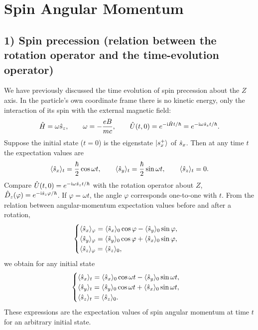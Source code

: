 \section{Spin Angular Momentum}
\subsection*{1) Spin precession (relation between the rotation operator and the time-evolution operator)}
We have previously discussed the time evolution of spin precession about the $Z$ axis. In the particle's own coordinate frame there is no kinetic energy, only the interaction of its spin with the external magnetic field:
\begin{equation}
\hat{H}=\omega\hat{s}_z,\qquad \omega=-\frac{eB}{mc},\qquad
\hat{U}(t,0)=e^{-\mathrm{i}\hat{H}t/\hbar}=e^{-\mathrm{i}\omega\hat{s}_zt/\hbar}.
\end{equation}
Suppose the initial state ($t=0$) is the eigenstate $\left|s_x^+\right\rangle$ of $\hat{s}_x$. Then at any time $t$ the expectation values are
\begin{equation}
\langle\hat{s}_x\rangle_t=\frac\hbar2\cos\omega t,\qquad
\langle\hat{s}_y\rangle_t=\frac\hbar2\sin\omega t,\qquad
\langle\hat{s}_z\rangle_t=0.
\end{equation}
Compare $\hat{U}(t,0)=e^{-\mathrm{i}\omega\hat{s}_zt/\hbar}$ with the rotation operator about $Z$, $\hat{D}_z(\varphi)=e^{-\mathrm{i}\hat{s}_z\varphi/\hbar}$. If $\varphi=\omega t$, the angle $\varphi$ corresponds one-to-one with $t$. From the relation between angular-momentum expectation values before and after a rotation,
\begin{equation}
\begin{cases}
\langle\hat{s}_x\rangle_\varphi=\langle\hat{s}_x\rangle_0\cos\varphi-\langle\hat{s}_y\rangle_0\sin\varphi,\\
\langle\hat{s}_y\rangle_\varphi=\langle\hat{s}_y\rangle_0\cos\varphi+\langle\hat{s}_x\rangle_0\sin\varphi,\\
\langle\hat{s}_z\rangle_\varphi=\langle\hat{s}_z\rangle_0,
\end{cases}
\end{equation}
we obtain for any initial state
\begin{equation}
\begin{cases}
\langle\hat{s}_x\rangle_t=\langle\hat{s}_x\rangle_0\cos\omega t-\langle\hat{s}_y\rangle_0\sin\omega t,\\
\langle\hat{s}_y\rangle_t=\langle\hat{s}_y\rangle_0\cos\omega t+\langle\hat{s}_x\rangle_0\sin\omega t,\\
\langle\hat{s}_z\rangle_t=\langle\hat{s}_z\rangle_0.
\end{cases}
\end{equation}
These expressions are the expectation values of spin angular momentum at time $t$ for an arbitrary initial state.

